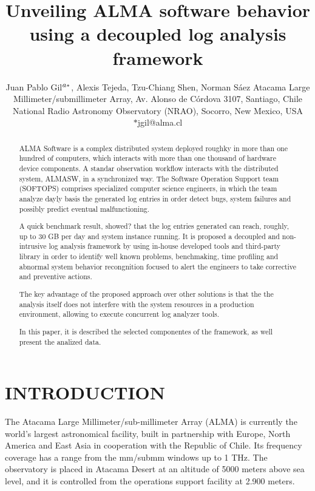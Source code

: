 \documentclass[]{spie}  %
\title{Unveiling ALMA software behavior using a decoupled log analysis framework}
\author{Juan Pablo Gil$\supit{a}^{*}$, Alexis Tejeda\supit{b}, Tzu-Chiang Shen\supit{a}, Norman S\'aez\supit{a}
\skiplinehalf
\supit{a}Atacama Large Millimeter/submillimeter Array, Av. Alonso de C\'ordova 3107, Santiago, Chile\\
\supit{b}National Radio Astronomy Observatory (NRAO), Socorro, New Mexico, USA\\ $*$jgil@alma.cl
}
\begin{document}
 
  \maketitle 

\begin{abstract}
ALMA Software is a complex distributed system deployed roughky in more than one
hundred of computers, which interacts with more than one thousand of hardware
device components. A standar observation workflow interacts with the
distributed system, ALMASW, in a synchronized way. The Software Operation
Support team (SOFTOPS) comprises specialized computer science engineers, in which the team analyze dayly basis the generated log entries in order detect bugs, system failures and possibly predict eventual malfunctioning. 

A quick benchmark result, showed? that the log entries generated can reach, roughly, up to 30 GB per day and system instance running. It is proposed a decoupled and non-intrusive log analysis framework by using in-house developed tools and third-party library in order to identify well known problems, benchmaking, time profiling and
abnormal system behavior recongnition focused to alert the engineers to take corrective and preventive actions.

The key advantage of the proposed approach over other solutions is that the the analysis itself does not interfere with the system resources in a production environment, allowing to execute concurrent log analyzer tools. 

In this paper, it is described the selected componentes of the framework, as well present the analized data.
\end{abstract}



\section{INTRODUCTION}\label{sec:intro}  %
The Atacama Large Millimeter/sub-millimeter Array (ALMA) is currently the
world's largest astronomical facility, built in partnership with Europe,
    North America and East Asia in cooperation with the Republic of Chile. Its
    frequency coverage has a range from the mm/submm windows up to 1 THz. The
    observatory is placed in Atacama Desert at an altitude of 5000 meters above
    sea level, and it is controlled from the operations support facility at
    2.900 meters.
\end{document}
